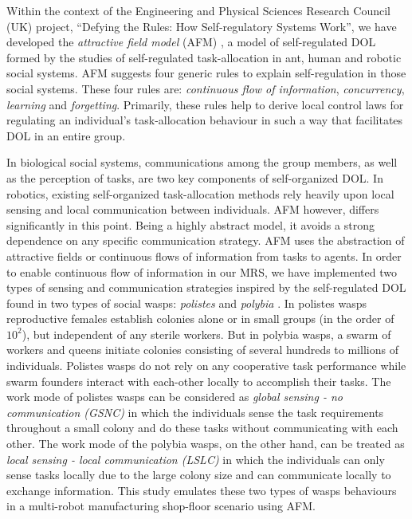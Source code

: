 \documentclass[journal]{IEEEtran}
\begin{document}
Within the context of the Engineering and Physical Sciences Research Council (UK) project, ``Defying the Rules: How Self-regulatory Systems Work'', we have developed the \textit{attractive field model} (AFM) \cite{Arcaute+2008}, a model of self-regulated DOL formed by the studies of self-regulated task-allocation in ant, human and robotic social systems. AFM suggests four generic rules to explain self-regulation in those social systems. These four rules are: \textit{continuous flow of information}, \textit{concurrency}, \textit{learning} and \textit{forgetting}. Primarily, these rules help to derive local control laws for regulating an individual's task-allocation behaviour in such a way that facilitates DOL in an entire group.

In biological social systems, communications among the group members, as well as the perception of tasks, are two key components of self-organized DOL. In robotics, existing self-organized task-allocation methods rely heavily upon local sensing and local communication between individuals. AFM however, differs significantly in this point.  Being a highly abstract model, it avoids a strong dependence on any specific communication strategy. %
AFM uses the abstraction of attractive fields or continuous flows of information from tasks to agents. %
In order to enable continuous flow of information in our \acl{MRS}, we have implemented two types of sensing and communication strategies inspired by the self-regulated DOL found in two types of social wasps: {\em polistes} and {\em polybia} \cite{Jeanne1999}. %
In polistes wasps reproductive females establish colonies alone or in small groups (in the order of $10^2$), but independent of any sterile workers.  But in polybia wasps,  a swarm of workers and queens initiate colonies consisting of several hundreds to millions of individuals.
Polistes wasps do not rely on any cooperative task performance while swarm founders interact with each-other locally to accomplish their tasks.  The work mode of polistes wasps can be considered as {\em global sensing - no communication (GSNC)} in which the individuals sense the task requirements throughout a small colony and do these tasks without communicating with each other.  The work mode of the polybia wasps, on the other hand, can be treated as {\em local sensing - local communication (LSLC)} in which the individuals can only sense tasks locally due to the large colony size and can communicate locally to exchange information.
This study emulates these two types of wasps behaviours in a multi-robot manufacturing shop-floor scenario using AFM.
\end{document}
